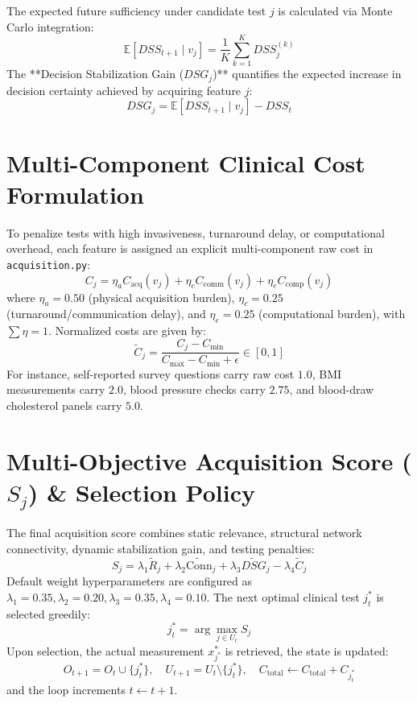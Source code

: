 \documentclass[11pt,a4paper]{report}
\begin{document}
The expected future sufficiency under candidate test $j$ is calculated via Monte Carlo integration:
\begin{equation}
  \mathbb{E}[DSS_{t+1} \mid v_j] = \frac{1}{K} \sum_{k=1}^K DSS_j^{(k)}
\end{equation}
The **Decision Stabilization Gain ($DSG_j$)** quantifies the expected increase in decision certainty achieved by acquiring feature $j$:
\begin{equation}
  DSG_j = \mathbb{E}[DSS_{t+1} \mid v_j] - DSS_t
\end{equation}

\section{Multi-Component Clinical Cost Formulation}
To penalize tests with high invasiveness, turnaround delay, or computational overhead, each feature is assigned an explicit multi-component raw cost in \texttt{acquisition.py}:
\begin{equation}
  C_j = \eta_a C_{\text{acq}}(v_j) + \eta_c C_{\text{comm}}(v_j) + \eta_e C_{\text{comp}}(v_j)
\end{equation}
where $\eta_a = 0.50$ (physical acquisition burden), $\eta_c = 0.25$ (turnaround/communication delay), and $\eta_e = 0.25$ (computational burden), with $\sum \eta = 1$. Normalized costs are given by:
\begin{equation}
  \widetilde{C}_j = \frac{C_j - C_{\min}}{C_{\max} - C_{\min} + \epsilon} \in [0, 1]
\end{equation}
For instance, self-reported survey questions carry raw cost $1.0$, BMI measurements carry $2.0$, blood pressure checks carry $2.75$, and blood-draw cholesterol panels carry $5.0$.

\section{Multi-Objective Acquisition Score ($S_j$) \& Selection Policy}
The final acquisition score combines static relevance, structural network connectivity, dynamic stabilization gain, and testing penalties:
\begin{equation}
  S_j = \lambda_1 \widetilde{R}_j + \lambda_2 \widetilde{\text{Conn}}_j + \lambda_3 \widetilde{DSG}_j - \lambda_4 \widetilde{C}_j
\end{equation}
Default weight hyperparameters are configured as $\lambda_1 = 0.35, \lambda_2 = 0.20, \lambda_3 = 0.35, \lambda_4 = 0.10$. The next optimal clinical test $j^*_t$ is selected greedily:
\begin{equation}
  j^*_t = \arg\max_{j \in U_t} S_j
\end{equation}
Upon selection, the actual measurement $x^*_{j^*}$ is retrieved, the state is updated:
\begin{equation}
  O_{t+1} = O_t \cup \{j^*_t\}, \quad U_{t+1} = U_t \setminus \{j^*_t\}, \quad C_{\text{total}} \leftarrow C_{\text{total}} + C_{j^*_t}
\end{equation}
and the loop increments $t \leftarrow t + 1$.
\end{document}
